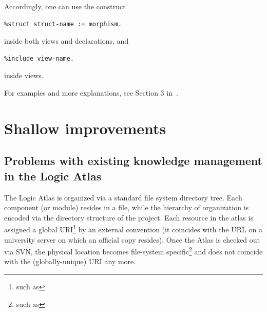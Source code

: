 Accordingly, one can use the construct
\begin{verbatim}
%struct struct-name := morphism.
\end{verbatim}
inside both views and  declarations, and
\begin{verbatim}
%include view-name.
\end{verbatim}
inside views.

For examples and more explanations, see Section 3 in~\cite{rabeEA:twelfmod:09}.


\section{Shallow improvements}\label{sec:shallow}
\subsection{Problems with existing knowledge management in the Logic Atlas}
The Logic Atlas is organized via a standard file system directory
tree. Each component (or module) resides in a file, while the
hierarchy of organization is encoded via the directory structure of
the project. Each resource in the atlas is assigned a global URI\footnote{such as } by an external convention (it coincides with the URL on a university server on which an official copy resides). Once the Atlas is checked out via SVN, the physical location becomes file-system specific\footnote{such as 
} and does not coincide with the (globally-unique) URI any more.

